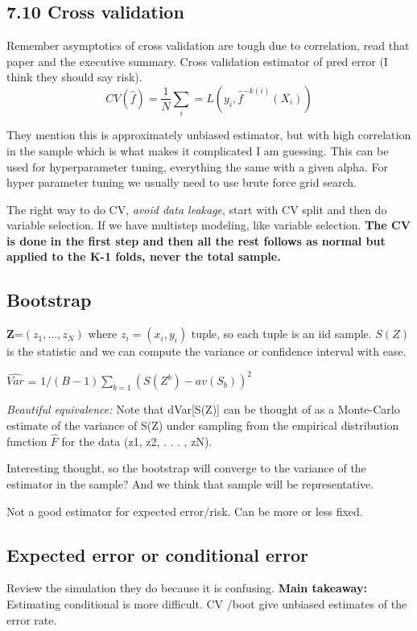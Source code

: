 \documentclass{article}
\begin{document}
\subsection*{7.10 Cross validation}
Remember asymptotics of cross validation are tough due to correlation, read that paper and the executive summary.
Cross validation estimator of pred error (I think they should say risk). $$CV(\hat{f})=\frac{1}{N}\sum_i=L(y_i,\hat{f}^{-k(i)}(X_i))$$

They mention this is approximately unbiased estimator, but with high correlation in the sample which is what makes it complicated I am guessing.
This can be used for hyperparameter tuning, everything the same with a given alpha. 
For hyper parameter tuning we usually need to use brute force grid search.

The right way to do CV, \textit{avoid data leakage}, start with CV split and then do variable selection. 
If we have multistep modeling, like variable selection. \textbf{The CV is done in the first step and then all the rest follows as normal but applied to the K-1 folds, never the total sample.}

\subsection*{Bootstrap}
\textbf{Z}=$(z_1,...,z_N)$ where $z_i = (x_i,y_i)$ tuple, so each tuple is an iid sample.
$S(Z) $ is the statistic and we can compute the variance or confidence interval with ease.

$\hat{Var}$ = $1/(B-1)\sum_{b=1}(S(Z^b)-av(S_b))^2$

\textit{Beautiful equivalence: }Note that dVar[S(Z)] can be thought of as a
Monte-Carlo estimate of the variance of S(Z) under sampling from the
empirical distribution function  $\hat{F}$ for the data (z1, z2, . . . , zN). 

Interesting thought, so the bootstrap will converge to the variance of the estimator in the sample? And we think that sample will be representative.

Not a good estimator for expected error/risk. Can be more or less fixed.

\subsection*{Expected error or conditional error}

Review the simulation they do because it is confusing. 
\textbf{Main takeaway:} Estimating conditional is more difficult. CV /boot give unbiased estimates of the error rate.
\end{document}
